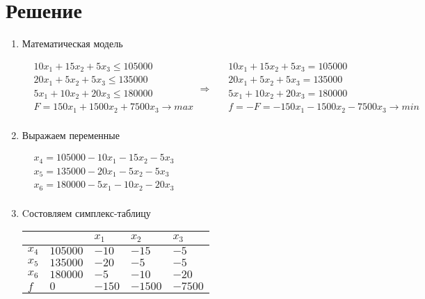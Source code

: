 \documentclass{article}
\begin{document}
\pagebreak

\section*{Решение}

\begin{enumerate}
\item Математическая модель
    
    $\begin{aligned}
        &10x_1 + 15x_2 + 5x_3 \leqslant 105000 \\
        &20x_1 + 5x_2 + 5x_3 \leqslant 135000 \\
        &5x_1 + 10x_2 + 20x_3 \leqslant 180000 \\
        &F = 150x_1 + 1500x_2 + 7500x_3 \rightarrow max\\
    \end{aligned} \Longrightarrow \ \ 
    \begin{aligned}
        &10x_1 + 15x_2 + 5x_3 = 105000 \\
        &20x_1 + 5x_2 + 5x_3 = 135000 \\
        &5x_1 + 10x_2 + 20x_3 = 180000 \\
        &f = -F = -150x_1 - 1500x_2 - 7500x_3 \rightarrow min\\
    \end{aligned}$
\item Выражаем переменные
    
    $\begin{aligned}
        &x_4 = 105000 - 10x_1 - 15x_2 - 5x_3 \\
        &x_5 = 135000 - 20x_1 - 5x_2 - 5x_3 \\
        &x_6 = 180000 - 5x_1 - 10x_2 - 20x_3 \\
    \end{aligned}$
\item Cостовляем симплекс-таблицу

    \begin{tabular}{ l | l | l | l | l }
        & & $x_1$ & $x_2$ & $x_3$ \\
        \hline
        $x_4$ & $105000$ & $-10$ & $-15$ & $-5$ \\
        $x_5$ & $135000$ & $-20$ & $-5$ & $-5$ \\
        $x_6$ & $180000$ & $-5$ & $-10$ & $\boxed{-20}$ \\
        \hline
        $f$   & $0$ & $-150$ & $-1500$ & $-7500$ \\
    \end{tabular}


\end{enumerate}
\end{document}
